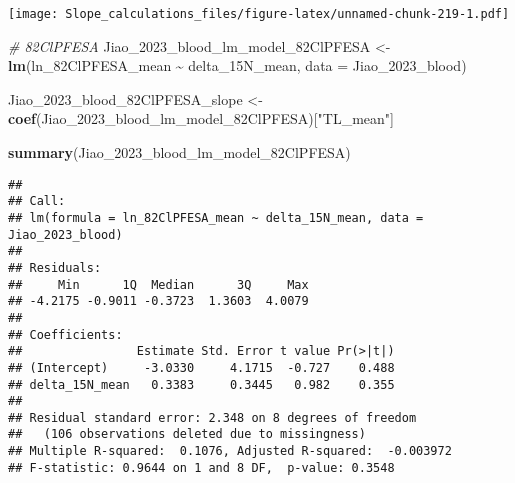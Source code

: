 \documentclass[
]{article}
\newenvironment{Shaded}{\begin{snugshade}}{\end{snugshade}}
\newcommand{\AttributeTok}[1]{\textcolor[rgb]{0.13,0.29,0.53}{#1}}
\newcommand{\CommentTok}[1]{\textcolor[rgb]{0.56,0.35,0.01}{\textit{#1}}}
\newcommand{\FunctionTok}[1]{\textcolor[rgb]{0.13,0.29,0.53}{\textbf{#1}}}
\newcommand{\NormalTok}[1]{#1}
\newcommand{\OtherTok}[1]{\textcolor[rgb]{0.56,0.35,0.01}{#1}}
\newcommand{\SpecialCharTok}[1]{\textcolor[rgb]{0.81,0.36,0.00}{\textbf{#1}}}
\newcommand{\StringTok}[1]{\textcolor[rgb]{0.31,0.60,0.02}{#1}}
\begin{document}
\texttt{[image: Slope\_calculations\_files/figure-latex/unnamed-chunk-219-1.pdf]}

\begin{Shaded}
\begin{Highlighting}[]
\CommentTok{\# 82ClPFESA}
\NormalTok{Jiao\_2023\_blood\_lm\_model\_82ClPFESA }\OtherTok{\textless{}{-}} \FunctionTok{lm}\NormalTok{(ln\_82ClPFESA\_mean }\SpecialCharTok{\textasciitilde{}}\NormalTok{ delta\_15N\_mean,}
                                    \AttributeTok{data =}\NormalTok{ Jiao\_2023\_blood)}

\NormalTok{Jiao\_2023\_blood\_82ClPFESA\_slope }\OtherTok{\textless{}{-}} \FunctionTok{coef}\NormalTok{(Jiao\_2023\_blood\_lm\_model\_82ClPFESA)[}\StringTok{"TL\_mean"}\NormalTok{]}

\FunctionTok{summary}\NormalTok{(Jiao\_2023\_blood\_lm\_model\_82ClPFESA)}
\end{Highlighting}
\end{Shaded}

\begin{verbatim}
## 
## Call:
## lm(formula = ln_82ClPFESA_mean ~ delta_15N_mean, data = Jiao_2023_blood)
## 
## Residuals:
##     Min      1Q  Median      3Q     Max 
## -4.2175 -0.9011 -0.3723  1.3603  4.0079 
## 
## Coefficients:
##                Estimate Std. Error t value Pr(>|t|)
## (Intercept)     -3.0330     4.1715  -0.727    0.488
## delta_15N_mean   0.3383     0.3445   0.982    0.355
## 
## Residual standard error: 2.348 on 8 degrees of freedom
##   (106 observations deleted due to missingness)
## Multiple R-squared:  0.1076, Adjusted R-squared:  -0.003972 
## F-statistic: 0.9644 on 1 and 8 DF,  p-value: 0.3548
\end{verbatim}
\end{document}
